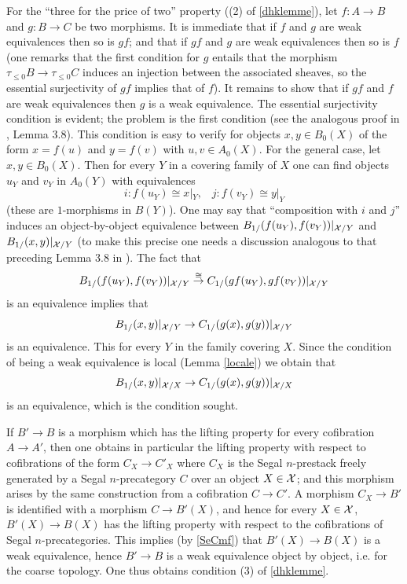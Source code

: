 For the ``three for the price of two'' property ((2) of \ref{dhklemme}),
let $f: A\rightarrow B$ and $g: B\rightarrow C$ be two morphisms. It is
immediate that if $f$ and $g$ are
weak equivalences then so is $gf$; and that if $gf$ and $g$ are
weak equivalences then so is $f$ (one remarks that the first
condition for $g$ entails that the morphism $\tau _{\leq 0}B\rightarrow \tau
_{\leq 0}C$ induces an injection between the associated sheaves, so the
essential surjectivity of $gf$ implies that of $f$). It remains to show
that if $gf$
and $f$
are weak equivalences then $g$ is a weak equivalence.
The essential surjectivity condition is evident; the problem is the
first condition (see the analogous proof in \cite{nCAT}, Lemma
3.8). This condition is easy to verify for objects
$x,y\in B_0(X)$ of the form
$x=f(u)$ and $y=f(v)$ with $u,v\in A_0(X)$. For the general case, let
$x,y\in
B_0(X)$. Then for every $Y$ in a covering family of $X$ one can
find
objects $u_Y$ and $v_Y$ in $A_0(Y)$ with equivalences
$$
i: f(u_Y)\cong x|_Y, \;\;\; j: f(v_Y)\cong y|_Y
$$
(these are $1$-morphisms in $B(Y)$). One may say that ``composition with
$i$ and $j$'' induces an object-by-object equivalence between
$B_{1/}(f(u_Y), f(v_Y))|_{{\cal X} /Y}$ and
$B_{1/}(x,y)|_{{\cal X} /Y}$ (to make this precise one needs a discussion
analogous to that preceding Lemma 3.8 in \cite{nCAT}). The fact that
$$
B_{1/}(f(u_Y), f(v_Y))|_{{\cal X} /Y}\stackrel{\cong}{\rightarrow}
C_{1/}(gf(u_Y), gf(v_Y))|_{{\cal X} /Y}
$$
is an equivalence
implies that
$$
B_{1/}(x, y)|_{{\cal X} /Y}\rightarrow
C_{1/}(g(x), g(y))|_{{\cal X} /Y}
$$
is an equivalence. This for every $Y$ in the family covering $X$.
Since the condition of being a weak equivalence is local
(Lemma \ref{locale})
we obtain that
$$
B_{1/}(x, y)|_{{\cal X} /X}\rightarrow
C_{1/}(g(x), g(y))|_{{\cal X} /X}
$$
is an equivalence, which is the condition sought.

If $B'\rightarrow B$ is a morphism which has the lifting
property for every cofibration $A\rightarrow A'$, then one obtains in
particular the lifting property with respect to cofibrations of the form
$C_X\rightarrow C'_X$ where $C_X$ is the Segal $n$-prestack freely
generated by a Segal $n$-precategory $C$ over an object $X\in {\cal X}$;
and this morphism arises by the same construction from a cofibration
$C\rightarrow C'$. A morphism $C_X\rightarrow B'$ is identified with a
morphism $C\rightarrow B'(X)$, and hence for every $X\in {\cal X}$, $B'(X)\rightarrow
B(X)$ has the lifting property with respect to the cofibrations
of Segal $n$-precategories. This implies (by \ref{SeCmf}) that $B'(X)\rightarrow
B(X)$ is a weak equivalence, hence $B'\rightarrow B$ is a
weak equivalence object by object, i.e. for the coarse topology. One
thus obtains condition (3) of \ref{dhklemme}.

